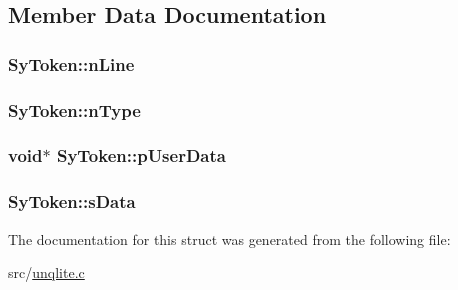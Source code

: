 \subsection{Member Data Documentation}
\hypertarget{struct_sy_token_abd07be802606ecdf3a121e0cba32c28e}{
\subsubsection[{n\-Line}]{ Sy\-Token\-::n\-Line}}\label{d3/deb/struct_sy_token_abd07be802606ecdf3a121e0cba32c28e}
\hypertarget{struct_sy_token_a5f87b218ff7391321ae4fce9621e7d01}{
\subsubsection[{n\-Type}]{ Sy\-Token\-::n\-Type}}\label{d3/deb/struct_sy_token_a5f87b218ff7391321ae4fce9621e7d01}
\hypertarget{struct_sy_token_a7e60a5c366345320717e78a0b8e652e7}{
\subsubsection[{p\-User\-Data}]{\setlength{\rightskip}{0pt plus 5cm}void$\ast$ Sy\-Token\-::p\-User\-Data}}\label{d3/deb/struct_sy_token_a7e60a5c366345320717e78a0b8e652e7}
\hypertarget{struct_sy_token_ae9d78edf5d608ecac3a226b58abee26f}{
\subsubsection[{s\-Data}]{ Sy\-Token\-::s\-Data}}\label{d3/deb/struct_sy_token_ae9d78edf5d608ecac3a226b58abee26f}


The documentation for this struct was generated from the following file\-:\begin{DoxyCompactItemize}
\item 
src/\hyperlink{unqlite_8c}{unqlite.\-c}\end{DoxyCompactItemize}
